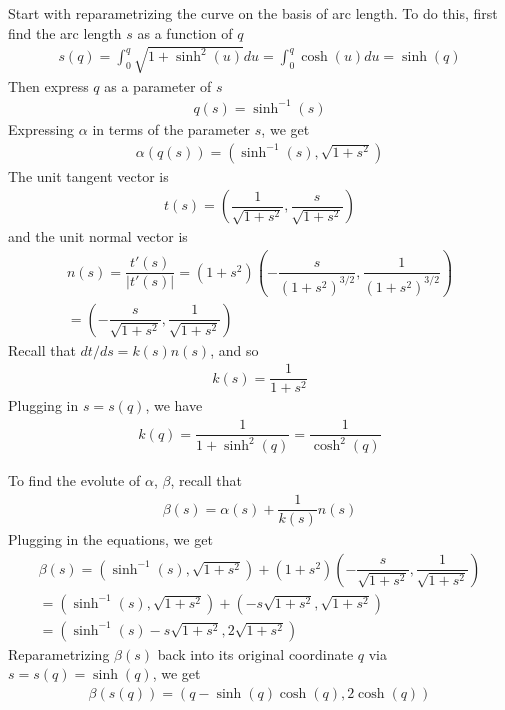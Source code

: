 \documentclass{article}
\begin{document}
	Start with reparametrizing the curve on the basis of arc length. To do this, first find the arc length $s$ as a function of $q$
	\begin{gather*}
		s(q) = \int_0^q \sqrt{ 1 + \sinh^2(u) } du = \int_0^q \cosh(u) du = \sinh(q)
	\end{gather*}
	Then express $q$ as a parameter of $s$
	\begin{gather*}
		q(s) = \sinh^{-1} (s)
	\end{gather*}
	Expressing $\alpha$ in terms of the parameter $s$, we get
	\begin{gather*}
		\alpha(q(s)) = \left( \sinh^{-1} (s), \sqrt{1 + s^2} \right)
	\end{gather*}
	The unit tangent vector is
	\begin{gather*}
		t(s) = \left( \dfrac{1}{\sqrt{1 + s^2}}, \dfrac{s}{\sqrt{1 + s^2}} \right)
	\end{gather*}
	and the unit normal vector is
	\begin{gather*}
		n(s) = \dfrac{t'(s)}{|t'(s)|} = (1 + s^2) \left( -\dfrac{s}{(1 + s^2)^{3/2}}, \dfrac{1}{(1 + s^2)^{3/2}} \right) \\
		= \left( -\dfrac{s}{ \sqrt{1 + s^2} }, \dfrac{1}{ \sqrt{1 + s^2} } \right) 
	\end{gather*}
	Recall that $dt/ds = k(s)n(s)$, and so
	\begin{gather*}
		k(s) = \dfrac{1}{1 + s^2}
	\end{gather*}
	Plugging in $s = s(q)$, we have
	\begin{gather*}
		k(q) = \dfrac{1}{1 + \sinh^2(q)} = \dfrac{1}{\cosh^2(q)}
	\end{gather*}

	To find the evolute of $\alpha$, $\beta$, recall that
	\begin{gather*}
		\beta(s) = \alpha(s) + \dfrac{1}{k(s)} n(s)
	\end{gather*}
	Plugging in the equations, we get
	\begin{gather*}
		\beta(s) = \left( \sinh^{-1} (s), \sqrt{1 + s^2} \right) + (1 + s^2) \left( -\dfrac{s}{ \sqrt{1 + s^2} }, \dfrac{1}{ \sqrt{1 + s^2} } \right) \\
		= \left( \sinh^{-1} (s), \sqrt{1 + s^2} \right) + \left( -s \sqrt{1 + s^2} , \sqrt{1 + s^2} \right) \\
		= \left( \sinh^{-1} (s) - s \sqrt{1 + s^2}, 2 \sqrt{1 + s^2} \right)
	\end{gather*}
	Reparametrizing $\beta(s)$ back into its original coordinate $q$ via $s = s(q) = \sinh(q)$, we get
	\begin{gather*}
		\beta(s(q)) = (q - \sinh(q) \cosh(q), 2 \cosh(q))
	\end{gather*}
	
\end{document}
